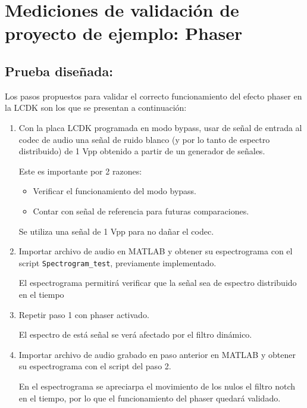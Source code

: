 \section{Mediciones de validación de proyecto de ejemplo: Phaser}

\subsection{Prueba diseñada:}

Los pasos propuestos para validar el correcto funcionamiento del efecto phaser en la LCDK son los que se presentan a continuación:

\begin{enumerate}
    \item Con la placa LCDK programada en modo bypass, usar de señal de entrada al codec de audio una señal de ruido blanco (y por lo tanto de espectro distribuido) de 1 Vpp obtenido a partir de un generador de señales.
    
    Este es importante por 2 razones:
    \begin{itemize}
        \item Verificar el funcionamiento del modo bypass.
        \item Contar con señal de referencia para futuras comparaciones.%
    \end{itemize}
    
    Se utiliza una señal de 1 Vpp para no dañar el codec.
    
    \item Importar archivo de audio en MATLAB y obtener su espectrograma con el script \texttt{Spectrogram\_test}, previamente implementado.
    
    El espectrograma permitirá verificar que la señal sea de espectro distribuido en el tiempo
    
    \item Repetir paso 1 con phaser activado.
    
    El espectro de está señal se verá afectado por el filtro dinámico.
    
    \item Importar archivo de audio grabado en paso anterior en MATLAB y obtener su espectrograma con el script del paso 2.
    
    En el espectrograma se apreciarpa el movimiento de los nulos el filtro notch en el tiempo, por lo que el funcionamiento del phaser quedará validado.
    
\end{enumerate}

